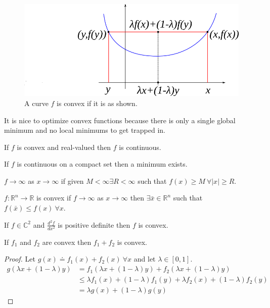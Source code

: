 \begin{figure}[ht!]
	\centering
	\includegraphics[width=.5\textwidth]{images/05convexGeoProof}
	\caption{A curve $f$ is convex if it is as shown.}
	\label{fig:05convexGeoProof}
\end{figure}

It is nice to optimize convex functions because there is only a single global minimum and no local minimums to get trapped in.

\begin{theorem}
If $f$ is convex and real-valued then $f$ is continuous.
\end{theorem}

\begin{theorem}
If $f$ is continuous on a compact set then a minimum exists.
\end{theorem}

\begin{definition}
$f\to\infty$ as $x\to\infty$ if given $M<\infty \exists R<\infty$ such that $f(x)\geq M ~\forall |x|\geq R$.
\end{definition}

\begin{theorem}
$f:\mathbb{R}^n\to\mathbb{R}$ is convex if $f\to\infty$ as $x\to\infty$ then $\exists \bar{x}\in\mathbb{R}^n$ such that $f(\bar{x})\leq f(x) ~\forall x$.
\end{theorem}

\begin{theorem}
If $f\in\mathbb{C}^2$ and $\frac{d^2f}{dx^2}$ is positive definite then $f$ is convex.
\end{theorem}

\begin{theorem}
\label{th:sumConvex}
If $f_1$ and $f_2$ are convex then $f_1+f_2$ is convex.
\end{theorem}

\begin{proof}
Let $g(x) \doteq f_1(x) + f_2(x) ~\forall x$ and let $\lambda\in[0,1]$.
\begin{align*}
g(\lambda x + (1-\lambda)y) &= f_1(\lambda x+(1-\lambda)y) + f_2(\lambda x+(1-\lambda)y) \\
&\leq \lambda f_1(x) + (1-\lambda)f_1(y) + \lambda f_2(x) + (1-\lambda)f_2(y) \\
&= \lambda g(x) + (1-\lambda)g(y)
\end{align*}
\end{proof}

